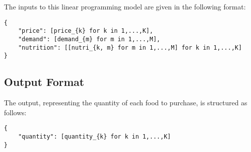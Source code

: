 \documentclass{article}
\begin{document}
The inputs to this linear programming model are given in the following format:

\begin{verbatim}
{
    "price": [price_{k} for k in 1,...,K],
    "demand": [demand_{m} for m in 1,...,M],
    "nutrition": [[nutri_{k, m} for m in 1,...,M] for k in 1,...,K]
}
\end{verbatim}

\subsection*{Output Format}

The output, representing the quantity of each food to purchase, is structured as follows:

\begin{verbatim}
{
    "quantity": [quantity_{k} for k in 1,...,K]
}
\end{verbatim}
\end{document}
